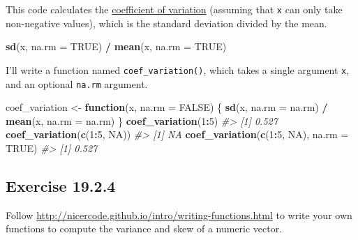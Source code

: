 \documentclass[]{book}
\newenvironment{Shaded}{\begin{snugshade}}{\end{snugshade}}
\newcommand{\CommentTok}[1]{\textcolor[rgb]{0.56,0.35,0.01}{\textit{#1}}}
\newcommand{\ControlFlowTok}[1]{\textcolor[rgb]{0.13,0.29,0.53}{\textbf{#1}}}
\newcommand{\DataTypeTok}[1]{\textcolor[rgb]{0.13,0.29,0.53}{#1}}
\newcommand{\DecValTok}[1]{\textcolor[rgb]{0.00,0.00,0.81}{#1}}
\newcommand{\KeywordTok}[1]{\textcolor[rgb]{0.13,0.29,0.53}{\textbf{#1}}}
\newcommand{\NormalTok}[1]{#1}
\newcommand{\OperatorTok}[1]{\textcolor[rgb]{0.81,0.36,0.00}{\textbf{#1}}}
\newcommand{\OtherTok}[1]{\textcolor[rgb]{0.56,0.35,0.01}{#1}}
\newcommand{\StringTok}[1]{\textcolor[rgb]{0.31,0.60,0.02}{#1}}
\theoremstyle{plain}
\theoremstyle{remark}
\begin{document}
This code calculates the
\href{https://en.wikipedia.org/wiki/Coefficient_of_variation}{coefficient
of variation} (assuming that \texttt{x} can only take non-negative
values), which is the standard deviation divided by the mean.

\begin{Shaded}
\begin{Highlighting}[]
\KeywordTok{sd}\NormalTok{(x, }\DataTypeTok{na.rm =} \OtherTok{TRUE}\NormalTok{) }\OperatorTok{/}\StringTok{ }\KeywordTok{mean}\NormalTok{(x, }\DataTypeTok{na.rm =} \OtherTok{TRUE}\NormalTok{)}
\end{Highlighting}
\end{Shaded}

I'll write a function named \texttt{coef\_variation()}, which takes a
single argument \texttt{x}, and an optional \texttt{na.rm} argument.

\begin{Shaded}
\begin{Highlighting}[]
\NormalTok{coef_variation <-}\StringTok{ }\ControlFlowTok{function}\NormalTok{(x, }\DataTypeTok{na.rm =} \OtherTok{FALSE}\NormalTok{) \{}
  \KeywordTok{sd}\NormalTok{(x, }\DataTypeTok{na.rm =}\NormalTok{ na.rm) }\OperatorTok{/}\StringTok{ }\KeywordTok{mean}\NormalTok{(x, }\DataTypeTok{na.rm =}\NormalTok{ na.rm)}
\NormalTok{\}}
\KeywordTok{coef_variation}\NormalTok{(}\DecValTok{1}\OperatorTok{:}\DecValTok{5}\NormalTok{)}
\CommentTok{#> [1] 0.527}
\KeywordTok{coef_variation}\NormalTok{(}\KeywordTok{c}\NormalTok{(}\DecValTok{1}\OperatorTok{:}\DecValTok{5}\NormalTok{, }\OtherTok{NA}\NormalTok{))}
\CommentTok{#> [1] NA}
\KeywordTok{coef_variation}\NormalTok{(}\KeywordTok{c}\NormalTok{(}\DecValTok{1}\OperatorTok{:}\DecValTok{5}\NormalTok{, }\OtherTok{NA}\NormalTok{), }\DataTypeTok{na.rm =} \OtherTok{TRUE}\NormalTok{)}
\CommentTok{#> [1] 0.527}
\end{Highlighting}
\end{Shaded}

\hypertarget{exercise-19.2.4}{%
\subsection*{\texorpdfstring{Exercise
{19.2.4}}{Exercise 19.2.4}}\label{exercise-19.2.4}}

Follow \url{http://nicercode.github.io/intro/writing-functions.html} to
write your own functions to compute the variance and skew of a numeric
vector.
\end{document}
